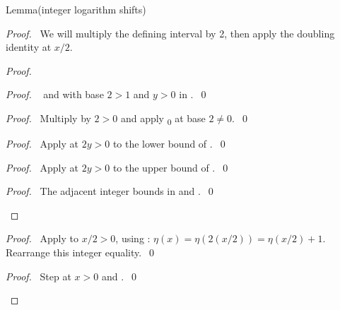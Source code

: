 \begin{mergedproofsection}
\begin{namedresult}{Lemma}{(integer logarithm shifts)}\label{lem:312-log}
\end{namedresult}
\begin{proof}
\pfsketch\ We will multiply the defining interval by 2, then apply
the doubling identity at $x/2$.
\begin{proof}
 \begin{proof}\pf\  and
  with base $2>1$ and $y>0$
 in .~\qed\end{proof}
 \begin{proof}\pf\ Multiply  by $2>0$ and
 apply \textsubscript{0} at base $2\ne0$.~\qed\end{proof}
 \begin{proof}\pf\ Apply  at $2y>0$
 to the lower bound of .~\qed\end{proof}
 \begin{proof}\pf\ Apply  at $2y>0$
 to the upper bound of .~\qed\end{proof}
 \qedstep
 \begin{proof}\pf\ The adjacent integer bounds in
  and .~\qed\end{proof}
\end{proof}
\begin{proof}\pf\ Apply  to $x/2>0$, using
: $\eta(x)=\eta(2(x/2))=\eta(x/2)+1$.
Rearrange this integer equality.~\qed\end{proof}
\qedstep
\begin{proof}\pf\ Step  at $x>0$ and
.~\qed\end{proof}
\end{proof}


\end{mergedproofsection}
